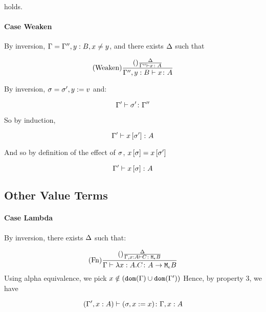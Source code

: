 {            holds.
            
        \paragraph{Case Weaken}
            By inversion, $\Gamma = \Gamma'', y: B, x \neq y$, and there exists $\Delta$ such that
 
            \begin{equation}
                (\text{Weaken}) \frac{(\text{}) \frac{\Delta}{\Gamma'' \vdash x \colon A}}{\Gamma'', y: B \vdash x \colon A}
            \end{equation}

            By inversion, $\sigma = \sigma', y:= v$
            and:

            \begin{equation}
                \Gamma' \vdash \sigma' \colon \Gamma''
            \end{equation}

            So by induction,

            \begin{equation}
                \Gamma' \vdash x\left[\sigma'\right] \colon A
            \end{equation}

            And so by definition of the effect of $\sigma$, $x\left[\sigma\right] = x\left[\sigma'\right]$

            \begin{equation}
                \Gamma' \vdash x\left[\sigma\right] \colon A
            \end{equation}
    \subsection{Other Value Terms}
    \paragraph{Case Lambda}
        By inversion, there exists $\Delta$ such that:

        \begin{equation}
            (\text{Fn}) \frac{
                (\text{}) \frac{\Delta}{\Gamma, x:A  \vdash C \colon \texttt{M}_{\epsilon}{B}}
            }{\Gamma \vdash \lambda x : A. C \colon A \rightarrow \texttt{M}_{\epsilon}{B}}
        \end{equation}
        Using alpha equivalence, we pick $x\notin(\texttt{dom}(\Gamma)\cup\texttt{dom}(\Gamma'))$
        Hence, by property 3, we have

        \begin{equation}
            (\Gamma', x:A ) \vdash (\sigma, x:= x) \colon \Gamma, x: A
        \end{equation}

}
